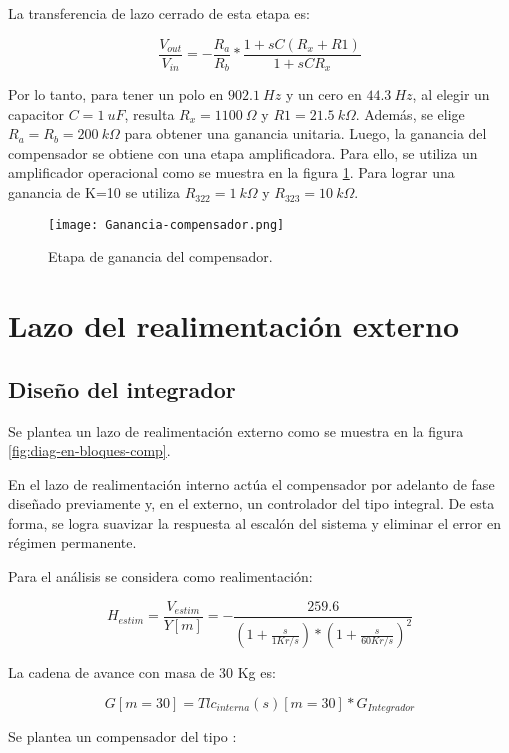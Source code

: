 \noindent La transferencia de lazo cerrado de esta etapa es:

\begin{equation} 
	\frac{V_{out}}{V_{in}}= - \frac{R_a}{R_b}*\frac{1+sC(R_x+R1)}{1+sCR_x}
\end{equation}

\noindent Por lo tanto, para tener un polo en $902.1\:Hz$ y un cero en $44.3\:Hz$, al elegir un capacitor $C = 1\:uF$, resulta $R_x = 1100\:\Omega$ y $R1 = 21.5\:k\Omega$. Además, se elige $R_a = R_b = 200\:k\Omega$ para obtener una ganancia unitaria. Luego, la ganancia del compensador se obtiene con una etapa amplificadora.
Para ello, se utiliza un amplificador operacional como se muestra en la figura \ref{fig:ganancia-compensador}. Para lograr una ganancia de K=10 se utiliza $R_{322} = 1\:k\Omega$ y $R_{323} = 10\:k\Omega$.


\begin{figure}[H]
	\centering
	\texttt{[image: Ganancia-compensador.png]}
	\caption{Etapa de ganancia del compensador.}
	\label{fig:ganancia-compensador}
\end{figure}

\section{Lazo del realimentación externo}
\subsection{Diseño del integrador}

\noindent Se plantea un lazo de realimentaci\'{o}n externo como se muestra en la  figura \ref{fig:diag-en-bloques-comp}.

\noindent En el lazo de realimentaci\'{o}n interno act\'{u}a el compensador por adelanto de fase dise\~{n}ado previamente y, en el externo, un controlador del tipo integral. De esta forma, se logra suavizar la respuesta al escal\'{o}n del sistema y eliminar el error en r\'{e}gimen permanente.


\noindent Para el an\'{a}lisis se considera como realimentaci\'{o}n: 

\[H_{estim}=\frac{V_{estim}}{Y[m]}= - \frac{259.6}{(1 + \frac{s}{1Kr/s})*(1+\frac{s}{60Kr/s})^2}\] 

\noindent La cadena de avance con masa de 30 Kg es:

\[G[m=30]=Tlc_{interna}(s)[m=30]*G_{Integrador}\] 

\noindent Se  plantea un compensador del tipo :

